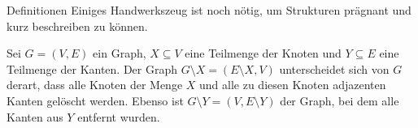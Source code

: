 \begin{chapter}{Definitionen}
  Einiges Handwerkszeug ist noch nötig, um Strukturen prägnant und kurz beschreiben zu können.
  
  \begin{definition}
   Sei $G=(V,E)$ ein Graph, $X \subseteq V$ eine Teilmenge der Knoten und $Y \subseteq E$ eine Teilmenge der Kanten. Der Graph $G\setminus X = (E\setminus X,V)$ unterscheidet sich von $G$ derart, dass alle Knoten der Menge $X$ und alle zu diesen Knoten adjazenten Kanten gelöscht werden. Ebenso ist $G\setminus Y = (V,E\setminus Y)$ der Graph, bei dem alle Kanten aus $Y$ entfernt wurden.
  \end{definition}


\end{chapter}